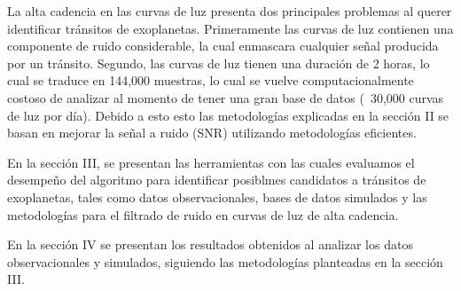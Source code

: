 La alta cadencia en las curvas de luz presenta dos principales problemas al querer identificar tránsitos de exoplanetas. Primeramente las curvas de luz contienen una componente de ruido considerable, la cual enmascara cualquier señal producida por un tránsito. Segundo, las curvas de luz tienen una duración de 2 horas, lo cual se traduce en 144,000 muestras, lo cual se vuelve computacionalmente costoso de analizar al momento de tener una gran base de datos (~30,000 curvas de luz por día).  Debido a esto esto las metodologías explicadas en la sección II se basan en mejorar la señal a ruido (SNR) utilizando metodologías eficientes.

En la sección III, se presentan las herramientas con las cuales evaluamos el desempeño del algoritmo para identificar posiblmes candidatos a tránsitos de exoplanetas, tales como datos observacionales, bases de datos simulados y las metodologías para el filtrado de ruido en curvas de luz de alta cadencia.

En la sección IV se presentan los resultados obtenidos al analizar los datos observacionales y simulados, siguiendo las metodologías planteadas en la sección III.














